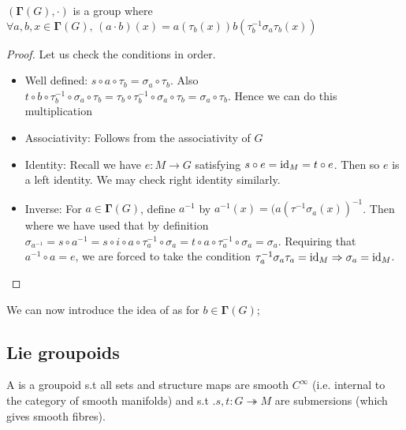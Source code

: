 \documentclass{article}
\begin{document}
\begin{prop}
$(\bm{\Gamma}(G),\cdot)$ is a group where $\forall a,b,x \in \bm{\Gamma}(G), \, (a \cdot b)(x) = a(\tau_b(x)) b(\tau_b^{-1} \sigma_a \tau_b(x))$
\end{prop}
\begin{proof}
Let us check the conditions in order.
\begin{itemize}
    \item Well defined: $s \circ a \circ \tau_b = \sigma_a \circ \tau_b$. Also $t \circ b \circ \tau_b^{-1} \circ \sigma_a \circ \tau_b = \tau_b \circ \tau_b^{-1} \circ \sigma_a \circ \tau_b = \sigma_a \circ \tau_b$. Hence we can do this multiplication
    \item Associativity: Follows from the associativity of $G$
    \item Identity: Recall we have $e:M \to G$ satisfying $s \circ e = \operatorname{id}_M = t \circ e$. Then 
    so $e$ is a left identity. We may check right identity similarly. 
    \item Inverse: For $a \in \bm{\Gamma}(G)$, define $a^{-1}$ by $a^{-1}(x) = (a(\tau^{-1} \sigma_a(x))^{-1}$. Then 
    where we have used that by definition $\sigma_{a^{-1}} = s \circ a^{-1} = s \circ i \circ a \circ \tau_{a}^{-1} \circ \sigma_a = t \circ a \circ \tau_a^{-1} \circ \sigma_a= \sigma_a$. Requiring that $a^{-1} \circ a = e$, we are forced to take the condition $\tau_a^{-1} \sigma_a \tau_a = \operatorname{id}_M \Rightarrow \sigma_a = \operatorname{id}_M$. 
\end{itemize}
\end{proof}

We can now introduce the idea of  as for $b \in \bm{\Gamma}(G)$;

\subsection{Lie groupoids}
\begin{definition}
A  is a groupoid s.t all sets and structure maps are smooth $C^\infty$ (i.e. internal to the category of smooth manifolds) and s.t .$s,t : G \twoheadrightarrow M$ are submersions (which gives smooth fibres). 
\end{definition}
\end{document}
